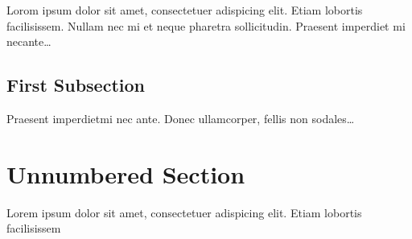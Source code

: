 \documentclass[a4paper, 14pt]{article}
\begin{document}
    Lorom ipsum dolor sit amet, consectetuer adispicing elit.
    Etiam lobortis facilisissem.
    Nullam nec mi et neque pharetra sollicitudin.
    Praesent imperdiet mi necante\ldots

    \subsection{First Subsection}
    Praesent imperdietmi nec ante.
    Donec ullamcorper, fellis non sodales\ldots

    \section*{Unnumbered Section} 
    Lorem ipsum dolor sit amet, consectetuer adispicing elit.
    Etiam lobortis facilisissem
\end{document}
